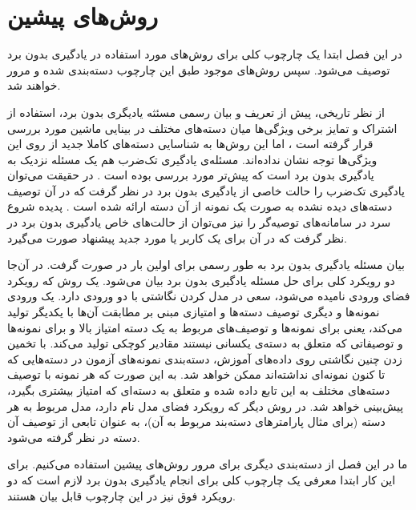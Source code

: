 \chapter{روش‌های پیشین} \label{chap:lr}
در این فصل ابتدا یک چارچوب کلی برای روش‌های مورد استفاده در یادگیری بدون برد توصیف می‌شود. سپس روش‌های موجود طبق این چارچوب دسته‌بندی شده و مرور خواهند شد.


از نظر تاریخی، پیش از تعریف و بیان رسمی مسئثه یادیگری بدون برد، استفاده از اشتراک و تمایز برخی ویژگی‌ها میان دسته‌های مختلف در بینایی ماشین مورد بررسی قرار گرفته است
\cite{BakkerH03, TsochantaridisJHA05, ulman2005}،
اما این روش‌ها به شناسایی دسته‌های کاملا جدید از روی این ویژگی‌ها توجه نشان نداده‌اند.
مسئله‌ی یادگیری تک‌ضرب
هم یک مسئله نزدیک به یادگیری بدون برد است که پیش‌تر مورد بررسی بوده است
\cite{miller12}.
در حقیقت می‌توان یادگیری تک‌ضرب را حالت خاصی از یادگیری بدون برد در نظر گرفت که در آن توصیف دسته‌های دیده نشده به صورت یک نمونه از آن دسته ارائه شده است
\cite{bengio08}.
 پدیده شروع سرد
 در سامانه‌های توصیه‌گر
 را نیز می‌توان از حالت‌های خاص یادگیری بدون برد در نظر گرفت که در آن برای یک کاربر یا مورد جدید پیشنهاد صورت می‌گیرد.


بیان مسئله  یادگیری بدون برد به طور رسمی برای اولین بار در
\cite{bengio08}
صورت گرفت. در آن‌جا دو رویکرد کلی برای حل مسئله یادگیری بدون برد بیان می‌شود. یک روش که رویکرد فضای ورودی
نامیده می‌شود، سعی در مدل کردن نگاشتی با دو ورودی دارد. یک ورودی نمونه‌ها و دیگری توصیف دسته‌ها و امتیازی مبنی بر مطابقت آن‌ها با یکدیگر تولید می‌کند، یعنی برای نمونه‌ها و توصیف‌های مربوط به یک دسته امتیاز بالا و برای نمونه‌ها و توصیفاتی که متعلق به دسته‌ی یکسانی نیستند مقادیر کوچکی تولید می‌کند. با تخمین زدن چنین نگاشتی روی داده‌های آموزش، دسته‌بندی نمونه‌های آزمون در دسته‌هایی که تا کنون نمونه‌ای نداشته‌اند ممکن خواهد شد. به این صورت که هر نمونه با توصیف دسته‌های مختلف به این تابع داده شده و متعلق به دسته‌ای که امتیاز بیشتری بگیرد، پیش‌بینی خواهد شد.
در روش دیگر که رویکرد فضای مدل
نام دارد، مدل مربوط به هر دسته (برای مثال پارامترهای دسته‌بند مربوط به آن)، به عنوان تابعی از توصیف آن دسته در نظر گرفته می‌شود.

ما در این فصل از دسته‌بندی دیگری برای مرور روش‌های پیشین استفاده می‌کنیم. برای این کار ابتدا معرفی یک چارچوب کلی برای انجام یادگیری بدون برد لازم است که دو رویکرد فوق نیز در این چارچوب قابل بیان هستند.

